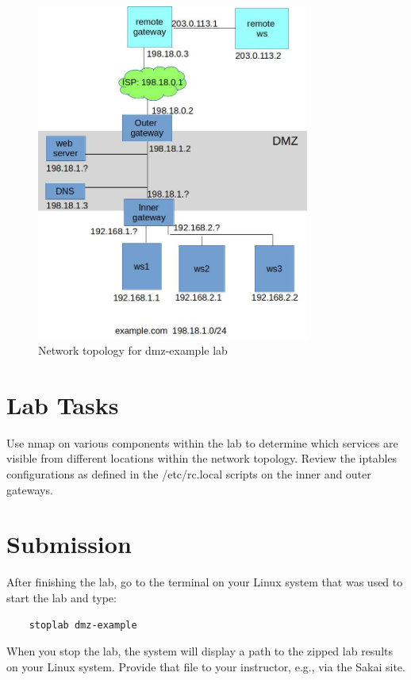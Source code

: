 \begin{figure}[H]
\begin{center}
\includegraphics [width=0.8\textwidth]{dmz-example.jpg}
\end{center}
\caption{Network topology for dmz-example lab}
\label{fig:topology}
\end{figure}

\section{Lab Tasks}
Use nmap on various components within the lab to determine which services are visible from
different locations within the network topology.  Review the iptables configurations as
defined in the /etc/rc.local scripts on the inner and outer gateways.

\section{Submission}
After finishing the lab, go to the terminal on your Linux system that was used to start the lab and type:
\begin{verbatim}
    stoplab dmz-example
\end{verbatim}
When you stop the lab, the system will display a path to the zipped lab results on your Linux system.  Provide that file to 
your instructor, e.g., via the Sakai site.


